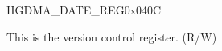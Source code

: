 \begin{register}{H}{GDMA\_DATE\_REG}{0x{}040C}\label{regdesc:DMADATEREG}
%
\regnewline%
\begin{regdesc}\begin{reglist}
\label{fielddesc:DMADATE}\item [GDMA\_DATE] This is the version control register. (R/W)
\end{reglist}\end{regdesc}
\end{register}


